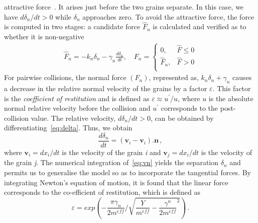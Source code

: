 attractive force~\citep{Poschel2005}. It arises just before the two grains 
separate. In this case, we have ${d{\delta_{n}}}$$/{dt} > 0$ while $\delta_{n}$ 
approaches zero. To avoid the attractive force, the force is computed in two 
stages: a candidate force $\hat{F}_{n}$ is calculated and verified as to 
whether it is non-negative
%
\begin{align}
 {\hat{F}_{n}}=-{{k}_{n}}{{\delta}_{n}}-{{\gamma}_{n}}\frac{d{{\delta}_{n}}}{dt},
  \quad F_{n}=
\begin{cases}
0, & {\hat{F}} \le 0 \\
{\hat{F}}_{n}, & {\hat{F}} > 0 \\
\end{cases} \label{eq:nf}
\end{align} 
%
For pairwise collisions, the normal force $(F_{n})$, represented as, 
${{k}_{n}}{{\delta}_{n}}+{{\gamma}_{n}}$ causes a decrease in the relative 
normal velocity of the grains by a factor $\varepsilon$. This factor is the 
\textit{coefficient of restitution} and is defined as $\varepsilon\approx 
u^\prime/u$, 
where $u$ is the absolute normal relative velocity before 
the collision and $u^\prime$ corresponds to the post-collision value. The 
relative velocity, ${d{\delta_{n}}}$$/{dt} > 0$, can be obtained by 
differentiating~\cref{eq:delta}. Thus, we obtain
%
\begin{equation}
\label{eq:vn}
\frac{d{\delta_{n}}}{dt}=(\mathbf{v}_{\mathit{i}}-\mathbf{v}_{\mathit{i}}).{\mathbf{n}}\,,
\end{equation}
%
where $\mathbf{v}_{\mathit{i}}=dx_{\mathit{i}}/dt$ is the velocity of the grain 
\textit{i} and $\mathbf{v}_{\mathit{j}}=dx_{\mathit{i}}/dt$ is the velocity of 
the grain \textit{j}. The numerical integration of~\cref{eq:vn} yields the 
separation $\delta_{n}$ and permits us to generalise the model so as to 
incorporate the tangential forces. By integrating 
Newton's equation of motion, it is found that the linear force corresponds to 
the co-efficient of restitution, which is defined as
%
\begin{equation}
\varepsilon=exp(-\frac{\pi\gamma_{n}}{2m^{eff}}/\sqrt{\frac{Y}{m^{eff}}
-{\frac{\gamma^{n}}{2m^{eff}}}^{2}})\,.
\end{equation}
% 


